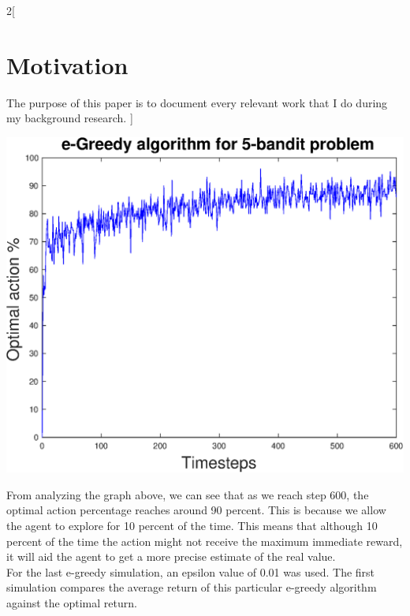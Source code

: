 \documentclass[a4paper]{article}
\newenvironment{Figure}
{\par\medskip\noindent\minipage{\linewidth}}
{\endminipage\par\medskip}
\begin{document}
\begin{multicols}{2}[
		\section*{Motivation}
		The purpose of this paper is to document every relevant work that I do during my background research.
		]
		\begin{Figure}
			\centering
			\includegraphics[width=\linewidth]{egreedyplot2.eps}
		\end{Figure}
		
		From analyzing the graph above, we can see that as we reach step 600, the optimal action percentage reaches around 90 percent. This is because we allow the agent to explore for 10 percent of the time. This means that although 10 percent of the time the action might not receive the maximum immediate reward, it will aid the agent to get a more precise estimate of the real value. \\
		
		For the last e-greedy simulation, an epsilon value of 0.01 was used. The first simulation compares the average return of this particular e-greedy algorithm against the optimal return.
		

\end{multicols}
\end{document}

